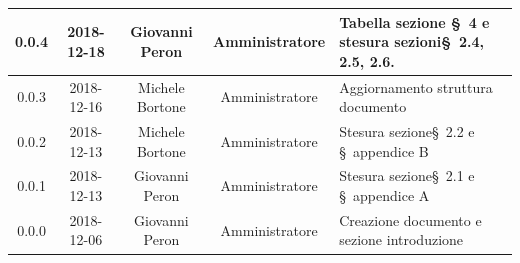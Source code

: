 \documentclass[11pt,a4paper]{article}
\begin{document}
\begin{tabularx}{\textwidth}{ c | c | c | c | X }
		0.0.4 & 2018-12-18 & Giovanni Peron & Amministratore & Tabella sezione \S\ 4 e stesura sezioni\S\ 2.4, 2.5, 2.6.\\ \hline
		0.0.3 & 2018-12-16 & Michele Bortone & Amministratore & Aggiornamento struttura documento\\ \hline
		0.0.2 & 2018-12-13 & Michele Bortone & Amministratore & Stesura sezione\S\ 2.2  e \S\ appendice B\\ \hline
		0.0.1 & 2018-12-13 & Giovanni Peron & Amministratore & Stesura sezione\S\ 2.1 e \S\ appendice A \\ \hline
		0.0.0 & 2018-12-06 & Giovanni Peron & Amministratore & Creazione documento e \newline sezione introduzione \\ \hline
	\end{tabularx}
	\newpage
	
	\tableofcontents
	\newpage
	\listoffigures
	\listoftables
	
	\newpage
		
	\newpage
	
	\newpage
		
	
\end{document}
